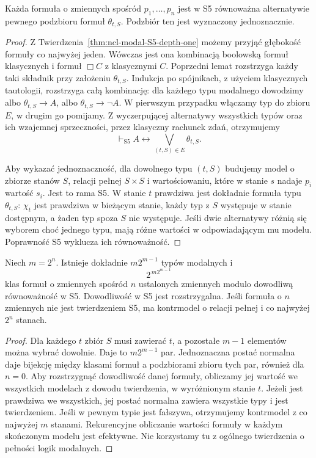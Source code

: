 \begin{twierdzenie}
\label{thm:ncl-modal-S5-normal-form}
Każda formuła o zmiennych spośród
$p_1,\ldots,p_n$ jest w S5 równoważna
alternatywie pewnego podzbioru formuł
$\theta_{t,S}$. Podzbiór ten jest wyznaczony
jednoznacznie.
\end{twierdzenie}
\begin{proof}
Z Twierdzenia~\ref{thm:ncl-modal-S5-depth-one}
możemy przyjąć głębokość formuły co najwyżej jeden.
Wówczas jest ona kombinacją boolowską
formuł klasycznych i formuł $\Box C$
z klasycznymi $C$. Poprzedni lemat rozstrzyga
każdy taki składnik przy założeniu
$\theta_{t,S}$. Indukcja po spójnikach,
z użyciem klasycznych tautologii, rozstrzyga
całą kombinację: dla każdego typu modalnego
dowodzimy albo $\theta_{t,S}\to A$,
albo $\theta_{t,S}\to\neg A$.
W pierwszym przypadku włączamy typ
do zbioru $E$, w drugim go pomijamy.
Z wyczerpującej alternatywy wszystkich typów
oraz ich wzajemnej sprzeczności, przez
klasyczny rachunek zdań, otrzymujemy
\[
 \vdash_{\mathrm{S5}} A\leftrightarrow
                \bigvee_{(t,S)\in E}\theta_{t,S}.
\]

Aby wykazać jednoznaczność, dla dowolnego
typu $(t,S)$ budujemy model o zbiorze stanów
$S$, relacji pełnej $S\times S$
i wartościowaniu, które w stanie $s$
nadaje $p_i$ wartość $s_i$.
Jest to rama S5. W stanie $t$ prawdziwa jest
dokładnie formuła typu $\theta_{t,S}$:
$\chi_t$ jest prawdziwa w bieżącym stanie,
każdy typ z $S$ występuje w stanie dostępnym,
a żaden typ spoza $S$ nie występuje.
Jeśli dwie alternatywy różnią się wyborem
choć jednego typu, mają różne wartości
w odpowiadającym mu modelu.
Poprawność S5 wyklucza ich równoważność.
\end{proof}

\begin{wniosek}
\label{cor:ncl-modal-S5-count}
Niech $m=2^n$. Istnieje dokładnie
$m2^{m-1}$ typów modalnych i
\[
 2^{\,m2^{m-1}}
\]
klas formuł o zmiennych spośród $n$ ustalonych
zmiennych modulo dowodliwą równoważność w S5.
Dowodliwość w S5 jest rozstrzygalna.
Jeśli formuła o $n$ zmiennych nie jest
twierdzeniem S5, ma kontrmodel o relacji
pełnej i co najwyżej $2^n$ stanach.
\end{wniosek}
\begin{proof}
Dla każdego $t$ zbiór $S$ musi zawierać $t$,
a pozostałe $m-1$ elementów można wybrać
dowolnie. Daje to $m2^{m-1}$ par.
Jednoznaczna postać normalna daje bijekcję
między klasami formuł a podzbiorami zbioru
tych par, również dla $n=0$.
Aby rozstrzygnąć dowodliwość danej formuły,
obliczamy jej wartość we wszystkich modelach
z dowodu twierdzenia, w wyróżnionym stanie $t$.
Jeżeli jest prawdziwa we wszystkich,
jej postać normalna zawiera wszystkie typy
i jest twierdzeniem. Jeśli w pewnym typie
jest fałszywa, otrzymujemy kontrmodel
z co najwyżej $m$ stanami.
Rekurencyjne obliczanie wartości formuły
w każdym skończonym modelu jest efektywne.
Nie korzystamy tu z ogólnego twierdzenia
o pełności logik modalnych.
\end{proof}

